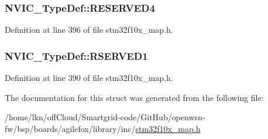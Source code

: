 \subsubsection[{\texorpdfstring{R\+E\+S\+E\+R\+V\+E\+D4}{RESERVED4}}]{ N\+V\+I\+C\+\_\+\+Type\+Def\+::\+R\+E\+S\+E\+R\+V\+E\+D4}\hypertarget{struct_n_v_i_c___type_def_ab90221b8a7ac983c4da617fdbaa28d99}{}\label{struct_n_v_i_c___type_def_ab90221b8a7ac983c4da617fdbaa28d99}


Definition at line 396 of file stm32f10x\+\_\+map.\+h.

\subsubsection[{\texorpdfstring{R\+S\+E\+R\+V\+E\+D1}{RSERVED1}}]{ N\+V\+I\+C\+\_\+\+Type\+Def\+::\+R\+S\+E\+R\+V\+E\+D1}\hypertarget{struct_n_v_i_c___type_def_a785e7e48ac18c752307c4b5c09bd8ddb}{}\label{struct_n_v_i_c___type_def_a785e7e48ac18c752307c4b5c09bd8ddb}


Definition at line 390 of file stm32f10x\+\_\+map.\+h.



The documentation for this struct was generated from the following file\+:\begin{DoxyCompactItemize}
\item 
/home/lkn/off\+Cloud/\+Smartgrid-\/code/\+Git\+Hub/openwsn-\/fw/bsp/boards/agilefox/library/inc/\hyperlink{agilefox_2library_2inc_2stm32f10x__map_8h}{stm32f10x\+\_\+map.\+h}\end{DoxyCompactItemize}
